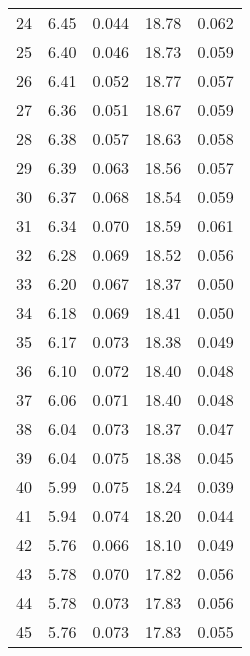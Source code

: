 \begin{table}
\begin{tabular}{c|ll|ll}
24 & 6.45 & 0.044 & 18.78 & 0.062 \\
25 & 6.40 & 0.046 & 18.73 & 0.059 \\
26 & 6.41 & 0.052 & 18.77 & 0.057 \\
27 & 6.36 & 0.051 & 18.67 & 0.059 \\
28 & 6.38 & 0.057 & 18.63 & 0.058 \\
29 & 6.39 & 0.063 & 18.56 & 0.057 \\
30 & 6.37 & 0.068 & 18.54 & 0.059 \\
31 & 6.34 & 0.070 & 18.59 & 0.061 \\
32 & 6.28 & 0.069 & 18.52 & 0.056 \\
33 & 6.20 & 0.067 & 18.37 & 0.050 \\
34 & 6.18 & 0.069 & 18.41 & 0.050 \\
35 & 6.17 & 0.073 & 18.38 & 0.049 \\
36 & 6.10 & 0.072 & 18.40 & 0.048 \\
37 & 6.06 & 0.071 & 18.40 & 0.048 \\
38 & 6.04 & 0.073 & 18.37 & 0.047 \\
39 & 6.04 & 0.075 & 18.38 & 0.045 \\
40 & 5.99 & 0.075 & 18.24 & 0.039 \\
41 & 5.94 & 0.074 & 18.20 & 0.044 \\
42 & 5.76 & 0.066 & 18.10 & 0.049 \\
43 & 5.78 & 0.070 & 17.82 & 0.056 \\
44 & 5.78 & 0.073 & 17.83 & 0.056 \\
45 & 5.76 & 0.073 & 17.83 & 0.055 \\
               \hline
        \end{tabular}
    \end{table}
    \clearpage

